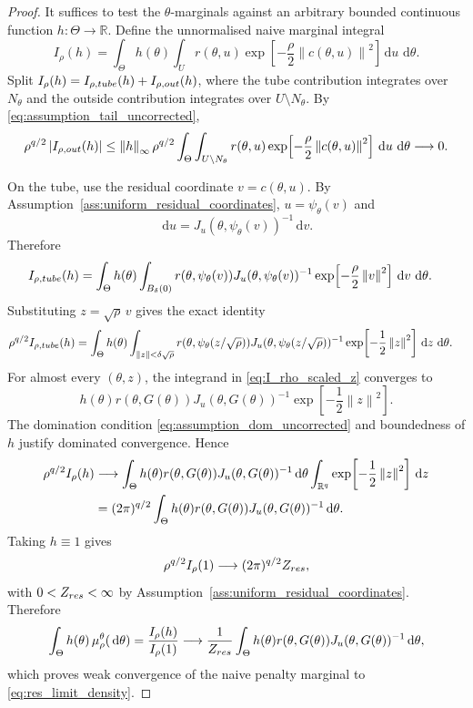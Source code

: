\documentclass[10pt,a4paper]{amsart}
\newcommand{\R}{\mathbb{R}}
\newcommand{\abs}[1]{\left\lvert #1\right\rvert}
\newcommand{\dd}{\,\mathrm{d}}
\newcommand{\norm}[1]{\left\lVert #1\right\rVert}
\begin{document}
\begin{proof}
It suffices to test the \(\theta\)-marginals against an arbitrary bounded
continuous function \(h:\Theta\to\R\). Define the unnormalised naive marginal
integral
\begin{equation}
 I_\rho(h)
 =
 \int_\Theta h(\theta)
 \int_U
 r(\theta,u)
 \exp\!\left[-\frac{\rho}{2}\norm{c(\theta,u)}^2\right]
 \dd u\,\dd\theta .
 \label{eq:I_rho_h_revised}
\end{equation}
Split \(I_\rho(h)=I_{\rho,{\rm tube}}(h)+I_{\rho,{\rm out}}(h)\), where the tube contribution integrates over \(N_\theta\) and the outside contribution integrates over \(U\setminus N_\theta\). By
\eqref{eq:assumption_tail_uncorrected},
\[
 \rho^{q/2}\abs{I_{\rho,{\rm out}}(h)}
 \le
 \norm{h}_\infty
 \rho^{q/2}
 \int_\Theta\int_{U\setminus N_\theta}
 r(\theta,u)
 \exp\!\left[-\frac{\rho}{2}\norm{c(\theta,u)}^2\right]
 \dd u\,\dd\theta
 \longrightarrow 0 .
\]

On the tube, use the residual coordinate \(v=c(\theta,u)\). By Assumption~\ref{ass:uniform_residual_coordinates}, \(u=\psi_\theta(v)\) and
\[
 \dd u
 =
 J_u(\theta,\psi_\theta(v))^{-1}\dd v .
\]
Therefore
\begin{align}
 I_{\rho,{\rm tube}}(h)
 &=
 \int_\Theta h(\theta)
 \int_{B_\delta(0)}
 r(\theta,\psi_\theta(v))
 J_u(\theta,\psi_\theta(v))^{-1}
 \exp\!\left[-\frac{\rho}{2}\norm{v}^2\right]
 \dd v\,\dd\theta .
 \label{eq:I_rho_tube_v}
\end{align}
Substituting \(z=\sqrt{\rho}\,v\) gives the exact identity
\begin{align}
 \rho^{q/2}I_{\rho,{\rm tube}}(h)
 &=
 \int_\Theta h(\theta)
 \int_{\norm{z}<\delta\sqrt{\rho}}
 r(\theta,\psi_\theta(z/\sqrt{\rho}))
 J_u(\theta,\psi_\theta(z/\sqrt{\rho}))^{-1}
 \exp\!\left[-\frac{1}{2}\norm{z}^2\right]
 \dd z\,\dd\theta .
 \label{eq:I_rho_scaled_z}
\end{align}
For almost every \((\theta,z)\), the integrand in
\eqref{eq:I_rho_scaled_z} converges to
\[
 h(\theta)
 r(\theta,G(\theta))
 J_u(\theta,G(\theta))^{-1}
 \exp\!\left[-\frac{1}{2}\norm{z}^2\right].
\]
The domination condition \eqref{eq:assumption_dom_uncorrected} and boundedness of \(h\) justify dominated convergence. Hence
\begin{align}
 \rho^{q/2}I_\rho(h)
 &\longrightarrow
 \int_\Theta h(\theta)
 r(\theta,G(\theta))
 J_u(\theta,G(\theta))^{-1}
 \dd\theta
 \int_{\R^q}
 \exp\!\left[-\frac{1}{2}\norm{z}^2\right]\dd z \notag\\
 &=
 (2\pi)^{q/2}
 \int_\Theta h(\theta)
 r(\theta,G(\theta))
 J_u(\theta,G(\theta))^{-1}
 \dd\theta .
 \label{eq:I_rho_limit_revised}
\end{align}
Taking \(h\equiv1\) gives
\[
 \rho^{q/2}I_\rho(1)
 \longrightarrow
 (2\pi)^{q/2}Z_{\rm res},
\]
with \(0<Z_{\rm res}<\infty\) by Assumption~\ref{ass:uniform_residual_coordinates}. Therefore
\[
 \int_\Theta h(\theta)\,\mu_\rho^\theta(\dd\theta)
 =
 \frac{I_\rho(h)}{I_\rho(1)}
 \longrightarrow
 \frac{1}{Z_{\rm res}}
 \int_\Theta h(\theta)
 r(\theta,G(\theta))
 J_u(\theta,G(\theta))^{-1}
 \dd\theta ,
\]
which proves weak convergence of the naive penalty marginal to
\eqref{eq:res_limit_density}.


\end{proof}
\end{document}
